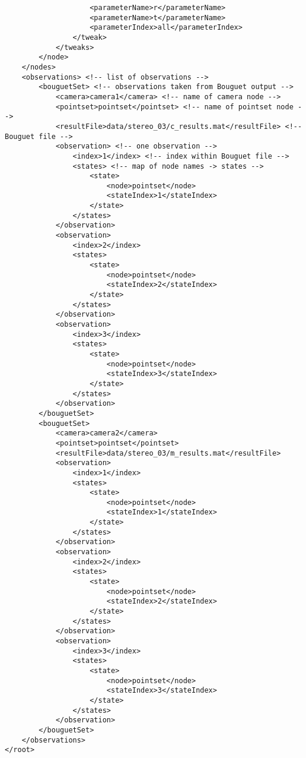 \begin{verbatim}
                    <parameterName>r</parameterName>
                    <parameterName>t</parameterName>
                    <parameterIndex>all</parameterIndex>
                </tweak>
            </tweaks>
        </node>
    </nodes>
    <observations> <!-- list of observations -->
        <bouguetSet> <!-- observations taken from Bouguet output -->
            <camera>camera1</camera> <!-- name of camera node -->
            <pointset>pointset</pointset> <!-- name of pointset node -->
            <resultFile>data/stereo_03/c_results.mat</resultFile> <!-- Bouguet file -->
            <observation> <!-- one observation -->
                <index>1</index> <!-- index within Bouguet file -->
                <states> <!-- map of node names -> states -->
                    <state>
                        <node>pointset</node>
                        <stateIndex>1</stateIndex>
                    </state>
                </states>
            </observation>
            <observation>
                <index>2</index>
                <states>
                    <state>
                        <node>pointset</node>
                        <stateIndex>2</stateIndex>
                    </state>
                </states>
            </observation>
            <observation>
                <index>3</index>
                <states>
                    <state>
                        <node>pointset</node>
                        <stateIndex>3</stateIndex>
                    </state>
                </states>
            </observation>
        </bouguetSet>
        <bouguetSet>
            <camera>camera2</camera>
            <pointset>pointset</pointset>
            <resultFile>data/stereo_03/m_results.mat</resultFile>
            <observation>
                <index>1</index>
                <states>
                    <state>
                        <node>pointset</node>
                        <stateIndex>1</stateIndex>
                    </state>
                </states>
            </observation>
            <observation>
                <index>2</index>
                <states>
                    <state>
                        <node>pointset</node>
                        <stateIndex>2</stateIndex>
                    </state>
                </states>
            </observation>
            <observation>
                <index>3</index>
                <states>
                    <state>
                        <node>pointset</node>
                        <stateIndex>3</stateIndex>
                    </state>
                </states>
            </observation>
        </bouguetSet>
    </observations>
</root>
\end{verbatim}